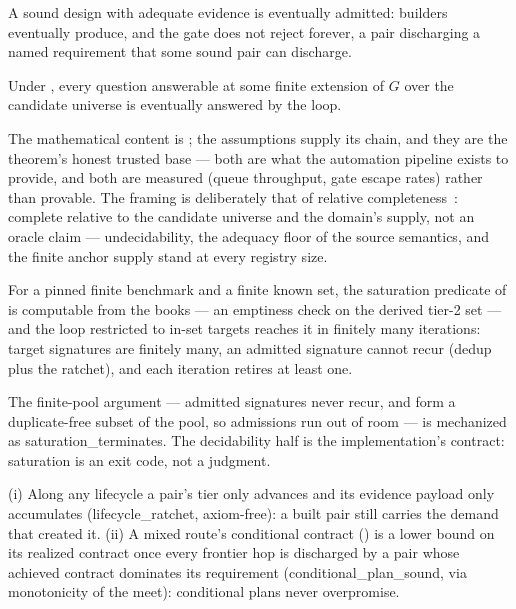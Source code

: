 \begin{assumption}
\label{ass:gate}
A sound design with adequate evidence is eventually admitted: builders
eventually produce, and the gate does not reject forever, a pair
discharging a named requirement that some sound pair can discharge.
\end{assumption}

\begin{theorem}
\label{thm:complete}
Under , every question answerable at some
finite extension of $G$ over the candidate universe is eventually
answered by the loop.
\end{theorem}

\noindent
The mathematical content is ; the assumptions supply
its chain, and they are the theorem's honest trusted base --- both
are what the automation pipeline exists to provide, and both are
measured (queue throughput, gate escape rates) rather than provable.
The framing is deliberately that of relative
completeness~\citep{cook1978soundness}: complete relative to the
candidate universe and the domain's supply, not an oracle claim ---
undecidability, the adequacy floor of the source semantics, and the
finite anchor supply stand at every registry size.

\begin{theorem}
\label{thm:saturation}
For a pinned finite benchmark and a finite known set, the saturation
predicate of  is computable from the books ---
an emptiness check on the derived tier-2 set --- and the loop
restricted to in-set targets reaches it in finitely many iterations:
target signatures are finitely many, an admitted signature cannot
recur (dedup plus the ratchet), and each iteration retires at least
one.
\end{theorem}

\noindent
The finite-pool argument --- admitted signatures never recur, and
form a duplicate-free subset of the pool, so admissions run out of
room --- is mechanized as
{\normalfont\textsf{saturation\_terminates}}. The decidability half
is the implementation's contract: saturation is an exit code, not a
judgment.

\begin{theorem}
\label{thm:currency}
(i) Along any lifecycle a pair's tier only advances and its evidence
payload only accumulates
{\normalfont(\textsf{lifecycle\_ratchet}, axiom-free)}: a built pair
still carries the demand that created it. (ii) A mixed route's
conditional contract () is a lower bound on its
realized contract once every frontier hop is discharged by a pair
whose achieved contract dominates its requirement
{\normalfont(\textsf{conditional\_plan\_sound}, via monotonicity of
the meet)}: conditional plans never overpromise.
\end{theorem}

